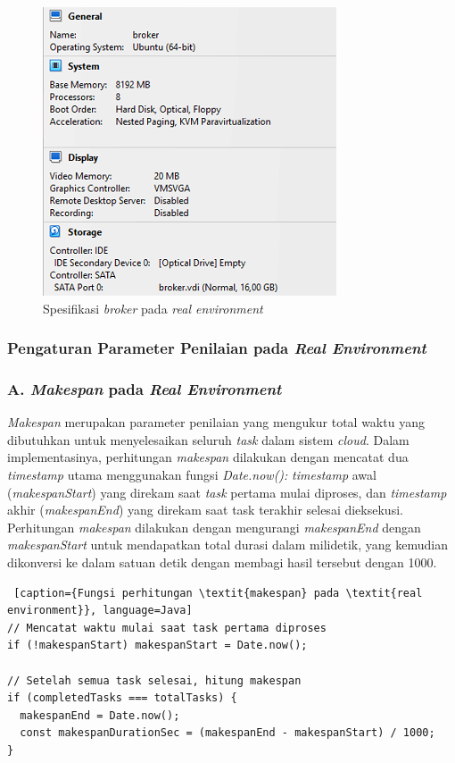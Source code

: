 \begin{figure} [H]
    \centering
    \includegraphics[width=0.5\linewidth]{gambar/Spesifikasi Broker.png}
    \caption{Spesifikasi \textit{broker} pada \textit{real environment}}
    \label{figure:Spesifikasi Broker Environment}
\end{figure}

\subsubsection{Pengaturan Parameter Penilaian pada \textit{Real Environment}}
\subsubsection{A. \textit{Makespan} pada \textit{Real Environment}}
\textit{Makespan} merupakan parameter penilaian yang mengukur total waktu yang dibutuhkan untuk menyelesaikan seluruh \textit{task} dalam sistem \textit{cloud}. Dalam implementasinya, perhitungan \textit{makespan} dilakukan dengan mencatat dua \textit{timestamp} utama menggunakan fungsi \textit{Date.now():} \textit{timestamp} awal (\textit{makespanStart}) yang direkam saat \textit{task} pertama mulai diproses, dan \textit{timestamp} akhir (\textit{makespanEnd}) yang direkam saat task terakhir selesai dieksekusi. Perhitungan \textit{makespan} dilakukan dengan mengurangi \textit{makespanEnd} dengan \textit{makespanStart} untuk mendapatkan total durasi dalam milidetik, yang kemudian dikonversi ke dalam satuan detik dengan membagi hasil tersebut dengan 1000.

\begin{lstlisting} [caption={Fungsi perhitungan \textit{makespan} pada \textit{real environment}}, language=Java]
// Mencatat waktu mulai saat task pertama diproses
if (!makespanStart) makespanStart = Date.now();

// Setelah semua task selesai, hitung makespan
if (completedTasks === totalTasks) {
  makespanEnd = Date.now();
  const makespanDurationSec = (makespanEnd - makespanStart) / 1000;
}
\end{lstlisting}

